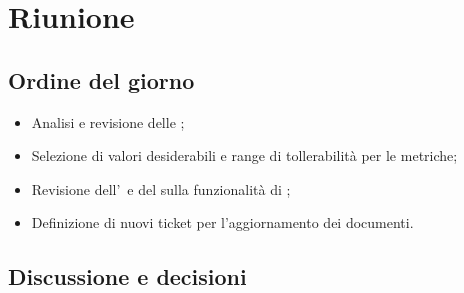 \section{Riunione}
\subsection{Ordine del giorno}
\begin{itemize}
	\item Analisi e revisione delle ;
	\item Selezione di valori desiderabili e range di tollerabilità per le metriche;
	\item Revisione dell'\AdR\ e del  sulla funzionalità di ;
	\item Definizione di nuovi ticket per l'aggiornamento dei documenti.
\end{itemize}

\subsection{Discussione e decisioni}
